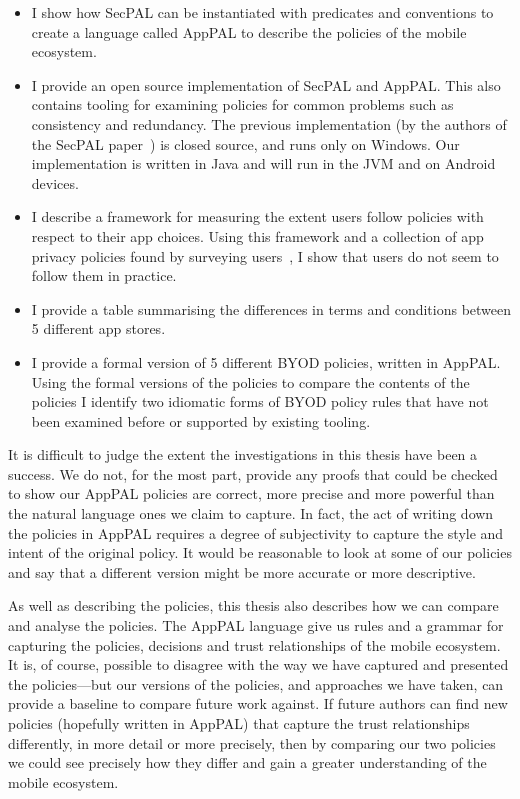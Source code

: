 \documentclass[thesis.tex]{subfiles}
\begin{document}
\begin{itemize}
  \item I show how SecPAL can be instantiated with predicates and conventions
    to create a language called AppPAL to describe the policies of the mobile
    ecosystem.
  \item I provide an open source implementation of SecPAL and AppPAL. This also
    contains tooling for examining policies for common problems such as
    consistency and redundancy.  The previous implementation (by the authors of
    the SecPAL paper~\cite{becker_secpal:_2006}) is closed source, and runs
    only on Windows.  Our implementation is written in Java and will run in the
    JVM and on Android devices.
  \item I describe a framework for measuring the extent users follow policies
    with respect to their app choices.  Using this framework and a collection
    of app privacy policies found by surveying users~\cite{lin_modeling_2014},
    I show that users do not seem to follow them in practice.
  \item I provide a table summarising the differences in terms and conditions
    between 5 different app stores.
  \item I provide a formal version of 5 different \ac{BYOD} policies, written in
    AppPAL.  Using the formal versions of the policies to compare the contents
    of the policies I identify two idiomatic forms of \ac{BYOD} policy rules that
    have not been examined before or supported by existing tooling.
\end{itemize}

It is difficult to judge the extent the investigations in this thesis have been
a success.  We do not, for the most part, provide any proofs that could be
checked to show our AppPAL policies are correct, more precise and more powerful
than the natural language ones we claim to capture.  In fact, the act of writing
down the policies in AppPAL requires a degree of subjectivity to capture the style
and intent of the original policy. It would be reasonable to look at some of
our policies and say that a different version might be more accurate or more
descriptive.

As well as describing the policies, this thesis also describes how we can
compare and analyse the policies. The AppPAL language give us rules and a
grammar for capturing the policies, decisions and trust relationships of the
mobile ecosystem.
%
It is, of course, possible to disagree with the way we have captured and presented the policies---but our versions of the policies, and approaches we have taken, can provide a baseline to compare future work against. If future authors can find new policies (hopefully written in AppPAL) that capture the trust relationships differently, in more detail or more precisely, then by comparing our two policies we could see precisely how they differ and gain a greater understanding of the mobile ecosystem.
\end{document}
